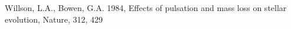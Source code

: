 \documentclass[a4paper,12pt]{article}
\begin{document}
\begin{thebibliography}{9}
    Willson, L.A., Bowen, G.A. 1984, Effects of pulsation and mass loss on stellar evolution, Nature, 312, 429



\end{thebibliography}
\end{document}
